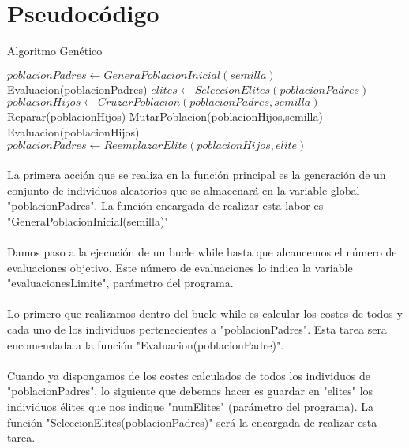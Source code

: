 	\section{Pseudocódigo}
	
	
		\begin{algorithm}[H]
			\caption{Algoritmo Genético}
			\begin{algorithmic}
				\STATE $poblacionPadres \leftarrow GeneraPoblacionInicial(semilla)$
				\STATE Evaluacion(poblacionPadres)
				\STATE $elites \leftarrow SeleccionElites(poblacionPadres)$
				\STATE $poblacionHijos \leftarrow CruzarPoblacion(poblacionPadres,semilla)$
				\STATE Reparar(poblacionHijos)
				\STATE MutarPoblacion(poblacionHijos,semilla)
				\STATE Evaluacion(poblacionHijos)
				\STATE $poblacionPadres \leftarrow ReemplazarElite(poblacionHijos, elite)$
				\ENDWHILE	
			\end{algorithmic}
		\end{algorithm}
	
	\paragraph{}La primera acción que se realiza en la función principal es la generación de un conjunto de individuos aleatorios que se almacenará en la variable global "poblacionPadres". La función encargada de realizar esta labor es "GeneraPoblacionInicial(semilla)"
	
	\paragraph{}Damos paso a la ejecución de un bucle while hasta que alcancemos el número de evaluaciones objetivo. Este número de evaluaciones lo indica la variable "evaluacionesLimite", parámetro del programa.
	
	\paragraph{}Lo primero que realizamos dentro del bucle while es calcular los costes de todos y cada uno de los individuos pertenecientes a "poblacionPadres". Esta tarea sera encomendada a la función "Evaluacion(poblacionPadre)".
	
	\paragraph{} Cuando ya dispongamos de los costes calculados de todos los individuos de "poblacionPadres", lo siguiente que debemos hacer es guardar en "elites" los individuos élites que nos indique "numElites" (parámetro del programa). La función "SeleccionElites(poblacionPadres)" será la encargada de realizar esta tarea.

